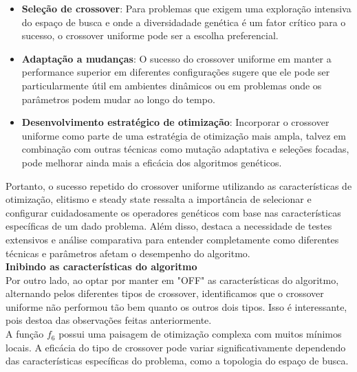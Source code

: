 \documentclass[a4paper, 12pt]{article}
\begin{document}
\begin{itemize}
    \item \textbf{Seleção de crossover}: Para problemas que exigem uma exploração intensiva do espaço de busca e onde a diversidadade genética é um fator crítico para o sucesso, o crossover uniforme pode ser a escolha preferencial.
    \item \textbf{Adaptação a mudanças}: O sucesso do crossover uniforme em manter a performance superior em diferentes configurações sugere que ele pode ser particularmente útil em ambientes dinâmicos ou em problemas onde os parâmetros podem mudar ao longo do tempo.
    \item \textbf{Desenvolvimento estratégico de otimização}:  Incorporar o crossover uniforme como parte de uma estratégia de otimização mais ampla, talvez em combinação com outras técnicas como mutação adaptativa e seleções focadas, pode melhorar ainda mais a eficácia dos algoritmos genéticos.
\end{itemize}

Portanto, o sucesso repetido do crossover uniforme utilizando as características de otimização, elitismo e steady state ressalta a importância de selecionar e configurar cuidadosamente os operadores genéticos com base nas características específicas de um dado problema. Além disso, destaca a necessidade de testes extensivos e análise comparativa para entender completamente como diferentes técnicas e parâmetros afetam o desempenho do algoritmo.\\

\textbf{Inibindo as características do algoritmo} \\

Por outro lado, ao optar por manter em "OFF" as características do algoritmo, alternando pelos diferentes tipos de crossover, identificamos que o crossover uniforme não performou tão bem quanto os outros dois tipos. Isso é interessante, pois destoa das observações feitas anteriormente.\\

A função $f_6$ possui uma paisagem de otimização complexa com muitos mínimos locais. A eficácia do tipo de crossover pode variar significativamente dependendo das características específicas do problema, como a topologia do espaço de busca.\\




























\end{document}
